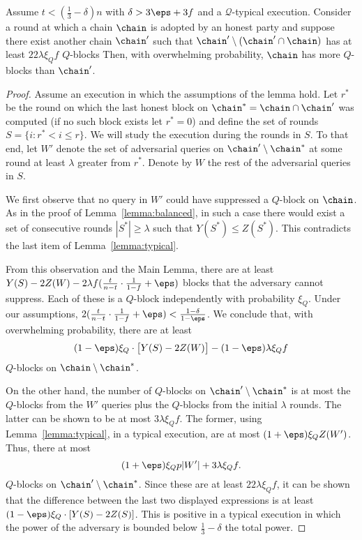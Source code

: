 \begin{lemma}\label{lemma:qblockcommonprefix}
	Assume $t<(\frac13-\delta)n$ with $\delta>3\eps+3f$ and a $\mathcal{Q}$-typical
	execution.
	Consider a round at which a chain $\chain$ is adopted by an honest party and
	suppose there exist another chain $\chain'$ such that
	$\chain'\setminus(\chain'\cap\chain)$ has at least $22\lambda\xi_Qf$ $Q$-blocks
	Then, with overwhelming probability, $\chain$ has more $Q$-blocks than $\chain'$.
\end{lemma}
\begin{proof}
	Assume an execution in which the assumptions of the lemma hold.
	Let $r^*$ be the round on which the last honest block on
	$\chain^*=\chain\cap\chain'$ was computed (if no such block exists let
	$r^*=0$) and define the set of rounds $S=\{i:r^*<i\leq r\}$.
	We will study the execution during the rounds in $S$.
	To that end, let $W'$ denote the set of adversarial queries
	on $\chain'\setminus\chain^*$ at some round at least $\lambda$ greater from
	$r^*$. Denote by $W$ the rest of the adversarial queries in $S$.

	We first observe that no query in $W'$ could have suppressed
	a $Q$-block on $\chain$.
	As in the proof of Lemma~\ref{lemma:balanced}, in such a case there would
	exist a set of consecutive rounds $|S^*|\ge\lambda$ such that $Y(S^*)\le
	Z(S^*)$.
	This contradicts the last item of Lemma~\ref{lemma:typical}.

	From this observation and the Main Lemma, there are at least
	$Y(S)-2Z(W)-2\lambda f(\frac t{n-t}\cdot\frac1{1-f}+\eps)$
	blocks that the adversary cannot
	suppress.
	Each of these is a $Q$-block independently with probability $\xi_Q$.
	Under our assumptions,
	$2(\frac t{n-t}\cdot\frac1{1-f}+\eps)<\frac{1-\delta}{1-\eps}$.
	We conclude that, with overwhelming probability, there are at least
	\[
		(1-\eps)\xi_Q\cdot\bigl[Y(S)-2Z(W)\bigr]-(1-\eps)\lambda\xi_Qf
	\]
	$Q$-blocks on $\chain\setminus\chain^*$.

	On the other hand, the number of $Q$-blocks on $\chain'\setminus\chain^*$ is
	at most the $Q$-blocks from the $W'$ queries plus the $Q$-blocks
	from the initial $\lambda$ rounds.
	The latter can be shown to be at most $3\lambda\xi_Qf$.
	The former, using
	Lemma~\ref{lemma:typical}, in a typical execution, are at most
	$(1+\eps)\xi_QZ(W')$. Thus, there at most
	\[
		(1+\eps)\xi_Qp|W'|+3\lambda\xi_Qf
	.\]
	$Q$-blocks on $\chain'\setminus\chain^*$.
	Since these are at least $22\lambda\xi_Qf$, it can be shown that
	the difference between the last two displayed expressions is at least
	$(1-\eps)\xi_Q\cdot[Y(S)-2Z(S)]$. This is positive in a typical execution
	in which the power of the adversary is bounded below $\frac13-\delta$ the
	total power.
\end{proof}

